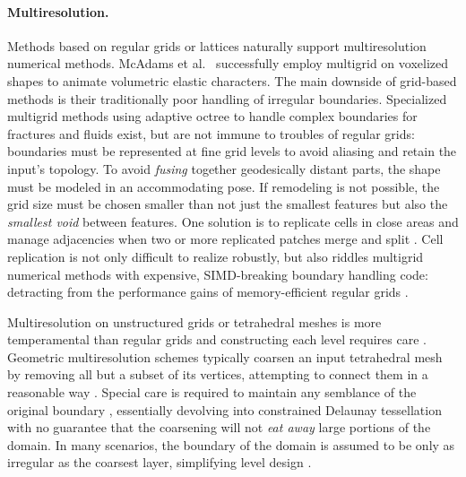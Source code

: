 \paragraph{Multiresolution.}
%
Methods based on regular grids or lattices naturally support multiresolution
numerical methods.
%
McAdams et al.\ 
successfully employ multigrid on voxelized shapes to animate
volumetric elastic characters.
%
The main downside of grid-based methods is their traditionally poor handling of
irregular boundaries.
%
Specialized multigrid methods using adaptive octree to handle complex
boundaries for fractures \cite{Dick:2011} and fluids \cite{Ferstl:2014} exist,
but are not immune to troubles of regular grids: boundaries must be 
represented at fine grid levels to avoid aliasing and retain the input's
topology.
%
To avoid \emph{fusing} together geodesically distant parts, the
shape must be modeled in an accommodating pose. If remodeling is not
possible, the grid size must be chosen smaller than not just the smallest
features but also the \emph{smallest void} between features.
%
One solution is to replicate cells in close areas and manage
adjacencies when two or more replicated patches merge and split
\cite{Teran:2005:CSS,Nesme:2009:PTE,Sykora09}.
%
Cell replication is not only difficult to realize robustly, but also riddles
multigrid numerical methods with expensive, SIMD-breaking boundary handling
code: detracting from the performance gains of memory-efficient regular grids
\cite{Demmel04}.

Multiresolution on unstructured grids or tetrahedral meshes is more
temperamental than regular grids and constructing each level requires care
\cite{fish1995efficient}.
%
Geometric multiresolution schemes typically coarsen an input tetrahedral mesh
by removing all but a subset of its vertices, attempting to connect them in a
reasonable way \cite{guillard1993,Adams:1999:PMS}. Special care is required to
maintain any semblance of the original boundary \cite{Brune:2011}, essentially
devolving into constrained Delaunay tessellation with no guarantee that the
coarsening will not \emph{eat away} large portions of the domain.
%
In many scenarios, the boundary of the domain is assumed to be only as
irregular as the coarsest layer, simplifying level design \cite{feng1997non}.

%

